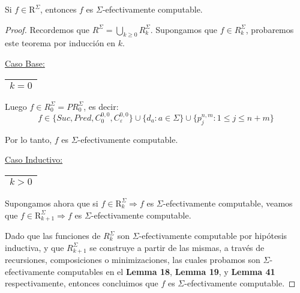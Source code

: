   \begin{theorem}
    \PN Si $f \in \mathrm{R}^{\Sigma}$, entonces $f$ es $\Sigma$-efectivamente computable.
  \end{theorem}
  \begin{proof}
    \PN Recordemos que $R^{\Sigma} = \bigcup\limits_{k \geq 0} R_{k}^{\Sigma}$. Supongamos que $f \in
    R_{k}^{\Sigma}$, probaremos este teorema por inducción en $k$.

    \vspace{3mm}
    \PN \underline{Caso Base:} \begin{tabular}{|c|} \hline $k = 0$ \\\hline \end{tabular}

    \vspace{1mm}
    \PN Luego $f \in R_{0}^{\Sigma} = PR_{0}^{\Sigma}$, es decir:
    \[
      f \in \{Suc, Pred, C_{0}^{0,0}, C_{\varepsilon}^{0,0}\} \cup \{d_{a}: a \in \Sigma\} \cup \{p_{j}^{n,m} : 1 \leq j
      \leq n+m\}
    \]

    \PN Por lo tanto, $f$ es $\Sigma$-efectivamente computable.

    \vspace{3mm}
	  \PN \underline{Caso Inductivo:} \begin{tabular}{|c|} \hline $k > 0$ \\\hline \end{tabular}

    \PN Supongamos ahora que si $f \in \mathrm{R}_{k}^{\Sigma} \Rightarrow f$ es $\Sigma$-efectivamente computable,
    veamos que $f \in \mathrm{R}_{k+1}^{\Sigma} \Rightarrow f$ es $\Sigma$-efectivamente computable.

    \PN Dado que las funciones de $R_{k}^{\Sigma}$ son $\Sigma$-efectivamente computable por hipótesis inductiva, y que
    $R_{k+1}^{\Sigma}$ se construye a partir de las mismas, a través de recursiones, composiciones o minimizaciones,
    las cuales probamos son $\Sigma$-efectivamente computables en el \textbf{Lemma 18}, \textbf{Lemma 19}, y
    \textbf{Lemma 41} respectivamente, entonces concluimos que $f$ es $\Sigma$-efectivamente computable.
  \end{proof}

